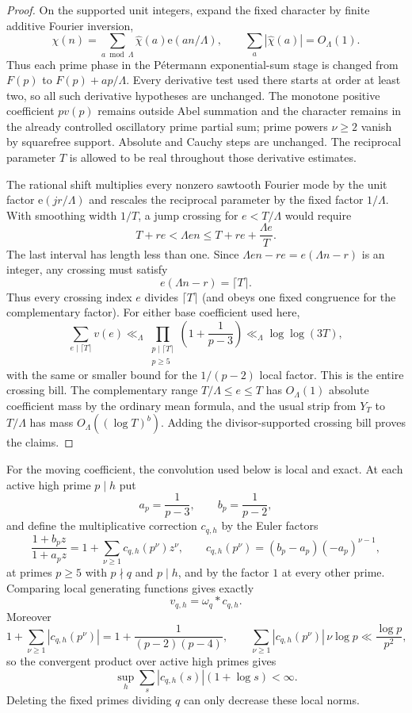 \documentclass[11pt]{article}
\theoremstyle{definition}
\theoremstyle{remark}
\newcommand{\1}{\mathbf 1}
\newcommand{\e}{\mathrm e}
\begin{document}
\begin{proof}
On the supported unit integers, expand the fixed character by finite additive
Fourier inversion,
\[
 \chi(n)=\sum_{a\bmod\Lambda}\widehat\chi(a)\e(an/\Lambda),
 \qquad \sum_a|\widehat\chi(a)|=O_\Lambda(1).
\]
Thus each prime phase in the P\'etermann exponential-sum stage is changed from
$F(p)$ to $F(p)+ap/\Lambda$.  Every derivative test used there starts at order
at least two, so all such derivative hypotheses are unchanged.  The monotone
positive coefficient $pv(p)$ remains outside Abel summation and the character
remains in the already controlled oscillatory prime partial sum; prime powers
$\nu\ge2$ vanish by squarefree support.  Absolute and Cauchy steps are
unchanged.  The reciprocal parameter $T$ is allowed to be real throughout
those derivative estimates.

The rational shift multiplies every nonzero sawtooth Fourier mode by the unit
factor $\e(jr/\Lambda)$ and rescales the reciprocal parameter by the fixed
factor $1/\Lambda$.  With smoothing width $1/T$, a jump crossing for
$e<T/\Lambda$ would require
\[
 T+re<\Lambda e n\le T+re+\frac{\Lambda e}{T}.
\]
The last interval has length less than one.  Since
$\Lambda e n-re=e(\Lambda n-r)$ is an integer, any crossing must satisfy
\[
 e(\Lambda n-r)=\lceil T\rceil.
\]
Thus every crossing index $e$ divides $\lceil T\rceil$ (and obeys one fixed
congruence for the complementary factor).  For either base coefficient used
here,
\[
 \sum_{e\mid\lceil T\rceil}v(e)
 \ll_\Lambda
 \prod_{\substack{p\mid\lceil T\rceil\\p\ge5}}
 \left(1+\frac1{p-3}\right)
 \ll_\Lambda\log\log(3T),
\]
with the same or smaller bound for the $1/(p-2)$ local factor.  This is the
entire crossing bill.  The complementary range $T/\Lambda\le e\le T$ has
$O_\Lambda(1)$ absolute coefficient mass by the ordinary mean formula, and the
usual strip from $Y_T$ to $T/\Lambda$ has mass
$O_\Lambda((\log T)^b)$.  Adding the divisor-supported crossing bill proves the
claims.
\end{proof}

For the moving coefficient, the convolution used below is local and exact.
At each active high prime $p\mid h$ put
\[
 a_p=\frac1{p-3},\qquad b_p=\frac1{p-2},
\]
and define the multiplicative correction $c_{q,h}$ by the Euler factors
\begin{equation}\label{eq:cqh-definition}
\frac{1+b_pz}{1+a_pz}
=1+\sum_{\nu\ge1}c_{q,h}(p^\nu)z^\nu,
\qquad
c_{q,h}(p^\nu)=(b_p-a_p)(-a_p)^{\nu-1},
\end{equation}
at primes $p\ge5$ with $p\nmid q$ and $p\mid h$, and by the factor $1$
at every other prime.  Comparing local generating functions gives exactly
\[
 v_{q,h}=\omega_q*c_{q,h}.
\]
Moreover
\[
1+\sum_{\nu\ge1}|c_{q,h}(p^\nu)|
=1+\frac1{(p-2)(p-4)},
\qquad
\sum_{\nu\ge1}|c_{q,h}(p^\nu)|\,\nu\log p
\ll\frac{\log p}{p^2},
\]
so the convergent product over active high primes gives
\begin{equation}\label{eq:fixed-q-convolution-transfer}
 \sup_h\sum_s|c_{q,h}(s)|(1+\log s)<\infty.
\end{equation}
Deleting the fixed primes dividing $q$ can only decrease these local norms.
\end{document}

